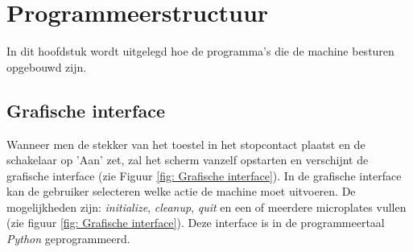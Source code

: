 \documentclass[a4paper,twoside,kulak]{kulakreport} %
\begin{document}
\chapter{Programmeerstructuur}

In dit hoofdstuk wordt uitgelegd hoe de programma's die de machine besturen opgebouwd zijn.

\section{Grafische interface}
Wanneer men de stekker van het toestel in het stopcontact plaatst en de schakelaar op 'Aan' zet, zal het scherm vanzelf opstarten en verschijnt de grafische interface (zie Figuur \ref{fig: Grafische interface}). In de grafische interface kan de gebruiker selecteren welke actie de machine moet uitvoeren. De mogelijkheden zijn: \textit{initialize}, \textit{cleanup}, \textit{quit} en een of meerdere microplates vullen (zie figuur \ref{fig: Grafische interface}). Deze interface is in de programmeertaal \textit{Python} geprogrammeerd. 
\end{document}
